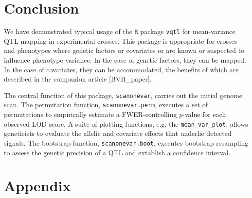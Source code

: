 \documentclass{article}
\begin{document}


\section*{Conclusion}

We have demonstrated typical usage of the \texttt{R} package \texttt{vqtl} for mean-variance QTL mapping in experimental crosses.
This package is appropriate for crosses and phenotypes where genetic factors or covariates or are known or suspected to influence phenotype variance.
In the case of genetic factors, they can be mapped.
In the case of covariates, they can be accommodated, the benefits of which are described in the companion article [BVH\_paper].

The central function of this package, \texttt{scanonevar}, carries out the initial genome scan.
The permutation function, \texttt{scanonevar.perm}, executes a set of permutations to empirically estimate a FWER-controlling $p$-value for each observed LOD score.
A suite of plotting functions, e.g. the \texttt{mean\_var\_plot}, allows geneticists to evaluate the allelic and covariate effects that underlie detected signals.
The bootstrap function, \texttt{scanonevar.boot}, executes bootstrap resampling to assess the genetic precision of a QTL and extablish a confidence interval. 


\printbibliography


\clearpage
\newpage
\section*{Appendix}
\end{document}
